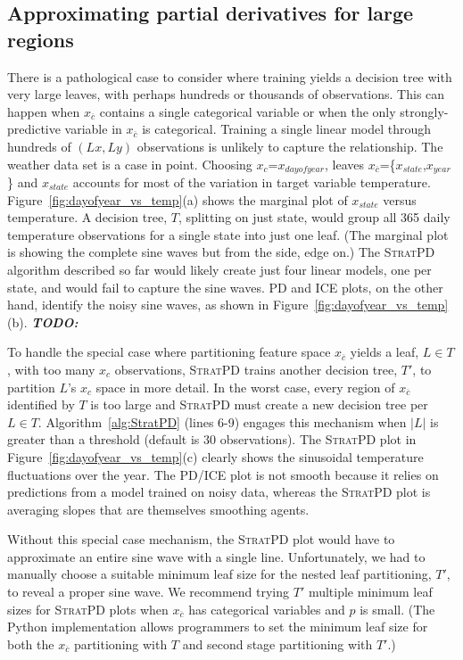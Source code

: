 \documentclass[12pt]{article}
\newcommand{\figref}[1]{Figure~\ref{#1}}
\newcommand{\algref}[1]{Algorithm~\ref{#1}}
\newcommand{\todo}[1]{{\bf\em TODO:} {{\color{red}{#1}}}}
\newcommand{\spd}{\fontfamily{cmr}\textsc{\small StratPD}}
\newcommand{\xnc}{$x_{\overline{c}}$}
\begin{document}
\subsection{Approximating partial derivatives for large regions}\label{sec:patho}

There is a pathological case to consider where training yields a decision tree with very large leaves, with perhaps hundreds or thousands of observations.  This can happen when \xnc{} contains a single categorical variable or when the only strongly-predictive variable in \xnc{} is categorical.  Training a single linear model through hundreds of $(Lx, Ly)$ observations is unlikely to capture the relationship.  The weather data set is a case in point. Choosing $x_c$=$x_{dayofyear}$, leaves \xnc{}=\{$x_{state}$,$x_{year}$\} and $x_{state}$ accounts for most of the variation in target variable temperature.  \figref{fig:dayofyear_vs_temp}(a) shows the marginal plot of $x_{state}$ versus temperature. A decision tree, $T$, splitting on just state, would group all 365 daily temperature observations for a single state into just one leaf. (The marginal plot is showing the complete sine waves but from the side, edge on.)  The \spd{} algorithm described so far would likely create just four linear models, one per state, and would fail to capture the sine waves. PD and ICE plots, on the other hand, identify the noisy sine waves, as shown in \figref{fig:dayofyear_vs_temp}(b). \todo{uses random forest with how many trees for pd/ice?}

To handle the special case where partitioning feature space \xnc{} yields a leaf, $L \in T$, with too many $x_c$ observations, \spd{} trains another decision tree, $T'$, to partition $L$'s $x_c$ space in more detail. In the worst case, every region of \xnc{} identified by $T$ is too large and \spd{} must create a new decision tree per $L \in T$. \algref{alg:StratPD} (lines 6-9) engages this mechanism when $|L|$ is greater than a threshold (default is 30 observations). The \spd{} plot in \figref{fig:dayofyear_vs_temp}(c) clearly shows the sinusoidal temperature fluctuations over the year. The PD/ICE plot is not smooth because it relies on predictions from a model trained on noisy data, whereas the \spd{} plot is averaging slopes that are themselves smoothing agents.

Without this special case mechanism, the \spd{} plot would have to approximate an entire sine wave with a single line.  Unfortunately, we had to manually choose a suitable minimum leaf size for the nested leaf partitioning, $T'$, to reveal a proper sine wave.  We recommend trying $T'$ multiple minimum leaf sizes for \spd{} plots when \xnc{} has categorical variables and $p$ is small. (The Python implementation allows programmers to set the minimum leaf size for both the \xnc{} partitioning with $T$ and second stage partitioning with $T'$.)
\end{document}
